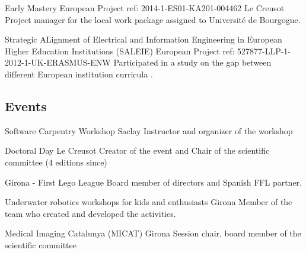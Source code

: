{Early Mastery}
{European Project ref: 2014-1-ES01-KA201-004462}
{}
{Le Creusot}
{
  Project manager for the local work package assigned to Université de Bourgogne.
}

{Strategic ALignment of Electrical and Information Engineering in European
  Higher Education Institutions (SALEIE)}
{European Project ref: 527877-LLP-1-2012-1-UK-ERASMUS-ENW}
{}
{}
{
  Participated in a study on the gap between different European institution curricula \parencite{ligusova2014reflections}.
}

\subsection{Events}

  {Software Carpentry Workshop}
  {}{}{Saclay}
  {Instructor and organizer of the workshop}

  {Doctoral Day}
  {}{}{Le Creusot}
  {Creator of the event and Chair of the scientific committee (4 editions since)}

{Girona - First Lego League}
{}
{}
{}
{Board member of directors and Spanish FFL partner.
}

{
	Underwater robotics workshops for kids and enthusiasts
}
{}
{}
{Girona}
{
	Member of the team who created and developed the activities.
}


  {Medical Imaging Catalunya (MICAT) }
  {}{}{Girona}
  {Session chair, board member of the scientific committee}

